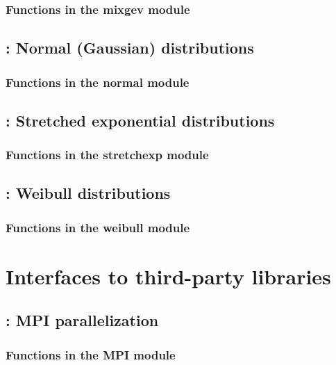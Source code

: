 \documentclass[10pt]{book}
\begin{document}
\subsection{Functions in the mixgev module}


\newpage
\section{: Normal (Gaussian) distributions}

\subsection{Functions in the normal module}


\newpage
\section{: Stretched exponential distributions}

\subsection{Functions in the stretchexp module}


\newpage
\section{: Weibull distributions}

\subsection{Functions in the weibull module}



\newpage
\chapter{Interfaces to third-party libraries}

\newpage
\section{: MPI parallelization}

\subsection{Functions in the MPI module}

\end{document}
